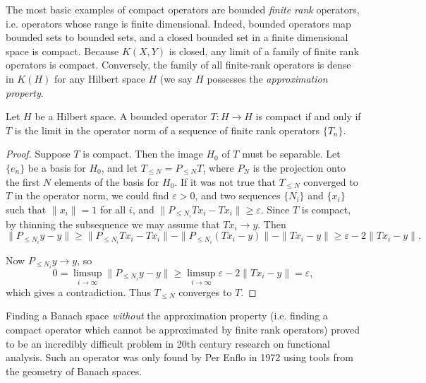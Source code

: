 The most basic examples of compact operators are bounded \emph{finite rank} operators, i.e. operators whose range is finite dimensional. Indeed, bounded operators map bounded sets to bounded sets, and a closed bounded set in a finite dimensional space is compact. Because $K(X,Y)$ is closed, any limit of a family of finite rank operators is compact. Conversely, the family of all finite-rank operators is dense in $K(H)$ for any Hilbert space $H$ (we say $H$ possesses the \emph{approximation property}.

\begin{theorem}
    Let $H$ be a Hilbert space. A bounded operator $T: H \to H$ is compact if and only if $T$ is the limit in the operator norm of a sequence of finite rank operators $\{ T_n \}$.
\end{theorem}
\begin{proof}
    Suppose $T$ is compact. Then the image $H_0$ of $T$ must be separable. Let $\{ e_n \}$ be a basis for $H_0$, and let $T_{\leq N} = P_{\leq N} T$, where $P_N$ is the projection onto the first $N$ elements of the basis for $H_0$. If it was not true that $T_{\leq N}$ converged to $T$ in the operator norm, we could find $\varepsilon > 0$, and two sequences $\{ N_i \}$ and $\{ x_i \}$ such that $\| x_i \| = 1$ for all $i$, and $\| P_{\leq N_i} T x_i - T x_i \| \geq \varepsilon$. Since $T$ is compact, by thinning the subsequence we may assume that $Tx_i \to y$. Then
    \[ \| P_{\leq N_i} y - y \| \geq \| P_{\leq N_i} Tx_i - Tx_i \| - \| P_{\leq N_i} (Tx_i - y) \| - \| Tx_i - y \| \geq \varepsilon - 2 \| Tx_i - y \|. \]

    Now $P_{\leq N_i} y \to y$, so
    \[ 0 = \limsup_{i \to \infty} \| P_{\leq N_i} y - y \| \geq \limsup_{i \to \infty} \varepsilon - 2 \| Tx_i - y \| = \varepsilon, \]
    which gives a contradiction. Thus $T_{\leq N}$ converges to $T$.
\end{proof}

\begin{remark}
    Finding a Banach space \emph{without} the approximation property (i.e. finding a compact operator which cannot be approximated by finite rank operators) proved to be an incredibly difficult problem in 20th century research on functional analysis. Such an operator was only found by Per Enflo in 1972 using tools from the geometry of Banach spaces.
\end{remark}

